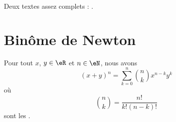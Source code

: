 
Deux textes assez complets : \cite{MesIntProbb,MathAgreg}.

                    \section{Binôme de Newton}

\begin{proposition}     \label{PropBinomFExOiL}
Pour tout $x$, $y\in\eR$ et $n\in\eN$, nous avons
\begin{equation}        \label{EqNewtonB}
    (x+y)^n=\sum_{k=0}^n{n\choose k}x^{n-k}y^k
\end{equation}
où
\begin{equation}
    {n\choose k}=\frac{ n! }{ k!(n-k)! }
\end{equation}
sont les .
\end{proposition}

